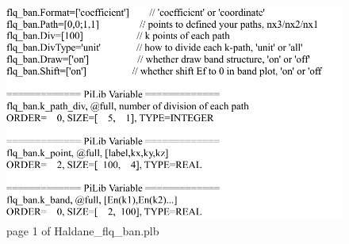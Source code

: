 \documentclass[10pt,a4paper]{article}
\begin{document}
  
\begin{figure}[tbp]
\centering
\includegraphics[width=0.9\columnwidth]{Haldane_flq_ban.pdf}
\caption{page 1 of Haldane\_flq\_ban.plb}
\end{figure}
\end{document}
